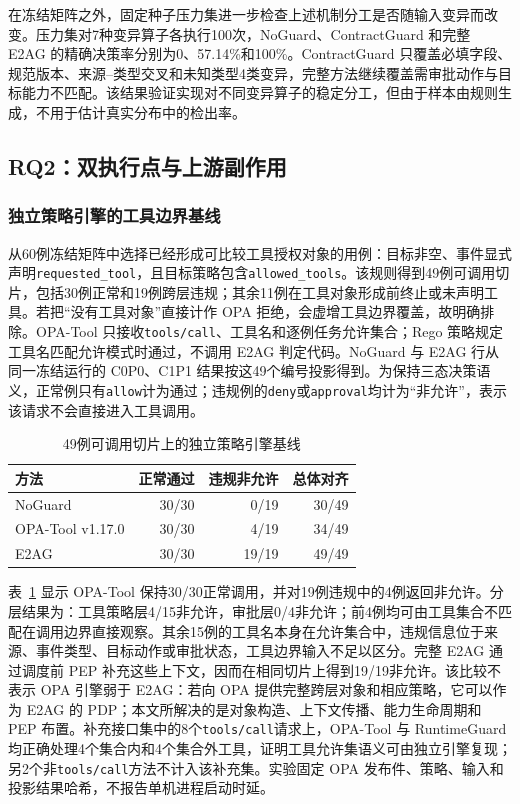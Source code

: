 在冻结矩阵之外，固定种子压力集进一步检查上述机制分工是否随输入变异而改变。压力集对7种变异算子各执行100次，NoGuard、ContractGuard 和完整 E2AG 的精确决策率分别为0、57.14\%和100\%。ContractGuard 只覆盖必填字段、规范版本、来源--类型交叉和未知类型4类变异，完整方法继续覆盖需审批动作与目标能力不匹配。该结果验证实现对不同变异算子的稳定分工，但由于样本由规则生成，不用于估计真实分布中的检出率。

\subsection{RQ2：双执行点与上游副作用}

\subsubsection{独立策略引擎的工具边界基线}

从60例冻结矩阵中选择已经形成可比较工具授权对象的用例：目标非空、事件显式声明\texttt{requested\_tool}，且目标策略包含\texttt{allowed\_tools}。该规则得到49例可调用切片，包括30例正常和19例跨层违规；其余11例在工具对象形成前终止或未声明工具。若把“没有工具对象”直接计作 OPA 拒绝，会虚增工具边界覆盖，故明确排除。OPA-Tool 只接收\texttt{tools/call}、工具名和逐例任务允许集合；Rego 策略规定工具名匹配允许模式时通过，不调用 E2AG 判定代码。NoGuard 与 E2AG 行从同一冻结运行的 C0P0、C1P1 结果按这49个编号投影得到。为保持三态决策语义，正常例只有\texttt{allow}计为通过；违规例的\texttt{deny}或\texttt{approval}均计为“非允许”，表示该请求不会直接进入工具调用。

\begin{table}[htbp]
\centering
\caption{49例可调用切片上的独立策略引擎基线}
\label{tab:rq2-opa-v11}
\small
\begin{tabular}{lrrr}
\toprule
方法 & 正常通过 & 违规非允许 & 总体对齐 \\
\midrule
NoGuard & 30/30 & 0/19 & 30/49 \\
OPA-Tool v1.17.0 & 30/30 & 4/19 & 34/49 \\
E2AG & 30/30 & 19/19 & 49/49 \\
\bottomrule
\end{tabular}
\end{table}

表~\ref{tab:rq2-opa-v11} 显示 OPA-Tool 保持30/30正常调用，并对19例违规中的4例返回非允许。分层结果为：工具策略层4/15非允许，审批层0/4非允许；前4例均可由工具集合不匹配在调用边界直接观察。其余15例的工具名本身在允许集合中，违规信息位于来源、事件类型、目标动作或审批状态，工具边界输入不足以区分。完整 E2AG 通过调度前 PEP 补充这些上下文，因而在相同切片上得到19/19非允许。该比较不表示 OPA 引擎弱于 E2AG：若向 OPA 提供完整跨层对象和相应策略，它可以作为 E2AG 的 PDP；本文所解决的是对象构造、上下文传播、能力生命周期和 PEP 布置。补充接口集中的8个\texttt{tools/call}请求上，OPA-Tool 与 RuntimeGuard 均正确处理4个集合内和4个集合外工具，证明工具允许集语义可由独立引擎复现；另2个非\texttt{tools/call}方法不计入该补充集。实验固定 OPA 发布件、策略、输入和投影结果哈希，不报告单机进程启动时延。

